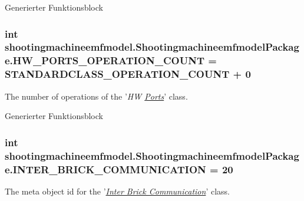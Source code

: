 Generierter Funktionsblock  \hypertarget{interfaceshootingmachineemfmodel_1_1_shootingmachineemfmodel_package_a5f85f99a2b80ea1b9f8c81dc620e69b3}{
\subsubsection[{H\-W\-\_\-\-P\-O\-R\-T\-S\-\_\-\-O\-P\-E\-R\-A\-T\-I\-O\-N\-\_\-\-C\-O\-U\-N\-T}]{\setlength{\rightskip}{0pt plus 5cm}int shootingmachineemfmodel.\-Shootingmachineemfmodel\-Package.\-H\-W\-\_\-\-P\-O\-R\-T\-S\-\_\-\-O\-P\-E\-R\-A\-T\-I\-O\-N\-\_\-\-C\-O\-U\-N\-T = {\bf S\-T\-A\-N\-D\-A\-R\-D\-C\-L\-A\-S\-S\-\_\-\-O\-P\-E\-R\-A\-T\-I\-O\-N\-\_\-\-C\-O\-U\-N\-T} + 0}}\label{interfaceshootingmachineemfmodel_1_1_shootingmachineemfmodel_package_a5f85f99a2b80ea1b9f8c81dc620e69b3}
The number of operations of the '{\itshape H\-W \hyperlink{interfaceshootingmachineemfmodel_1_1_ports}{Ports}}' class.

Generierter Funktionsblock  \hypertarget{interfaceshootingmachineemfmodel_1_1_shootingmachineemfmodel_package_ae54fb130a6b1815edc13aeaabc6a3f29}{
\subsubsection[{I\-N\-T\-E\-R\-\_\-\-B\-R\-I\-C\-K\-\_\-\-C\-O\-M\-M\-U\-N\-I\-C\-A\-T\-I\-O\-N}]{\setlength{\rightskip}{0pt plus 5cm}int shootingmachineemfmodel.\-Shootingmachineemfmodel\-Package.\-I\-N\-T\-E\-R\-\_\-\-B\-R\-I\-C\-K\-\_\-\-C\-O\-M\-M\-U\-N\-I\-C\-A\-T\-I\-O\-N = 20}}\label{interfaceshootingmachineemfmodel_1_1_shootingmachineemfmodel_package_ae54fb130a6b1815edc13aeaabc6a3f29}
The meta object id for the '\hyperlink{classshootingmachineemfmodel_1_1impl_1_1_inter_brick_communication_impl}{{\itshape Inter Brick Communication}}' class.

